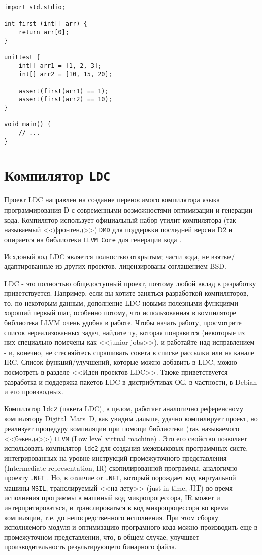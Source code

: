 \documentclass{studrep}
\begin{document}
\begin{verbatim}
import std.stdio;

int first (int[] arr) {
    return arr[0];
}

unittest {
    int[] arr1 = [1, 2, 3];
    int[] arr2 = [10, 15, 20];

    assert(first(arr1) == 1);
    assert(first(arr2) == 10);
}

void main() {
    // ...
}
\end{verbatim}

\section{Компилятор \texttt{LDC}}

Проект LDC направлен на создание переносимого компилятора языка программирования D с современными возможностями оптимизации и генерации кода. Компилятор использует официальный набор утилит компилятора (так называемый <<фронтенд>>) \texttt{DMD} для поддержки последней версии D2 и опирается на библиотеки \texttt{LLVM Core} для генерации кода \cite{ldcwiki}.

Исхдоный код LDC является полностью открытым; части кода, не взятые/адаптированные из других проектов, лицензированы соглашением BSD.

LDC - это полностью общедоступный проект, поэтому любой вклад в разработку приветствуется. Например, если вы хотите заняться разработкой компиляторов, то, по некоторым данным, дополнение LDC новыми полезными функциями -- хороший первый шаг, особенно потому, что использованная в компиляторе библиотека LLVM очень удобна в работе. Чтобы начать работу, просмотрите список нереализованных задач, найдите ту, которая понравится (некоторые из них специально помечены как <<junior jobs>>), и работайте над исправлением - и, конечно, не стесняйтесь спрашивать совета в списке рассылки или на канале IRC. Список функций/улучшений, которые можно добавить в LDC, можно посмотреть в разделе <<Идеи проектов LDC>>. Также приветствуется разработка и поддержка пакетов LDC в дистрибутивах ОС, в частности, в Debian и его производных.

Компилятор \texttt{ldc2} (пакета LDC), в целом, работает аналогично референсному компилятору Digital~Mars~D, как увидим дальше, удачно компилирует проект, но реализует процедуру компиляции при помощи библиотеки (так называемого <<бэкенда>>) \texttt{LLVM} (Low level virtual machine) \cite{llvm}.  Это его свойство позволяет использовать компилятор \texttt{ldc2} для создания межязыковых программных систе, интегрированных на уровне инструкций промежуточного представления (Intermediate representation, IR) скопилированной программы, аналогично проекту \texttt{.NET} \cite{dotnet}.  Но, в отличие от \texttt{.NET}, который порождает код виртуальной машины \texttt{MSIL}, транслируемый <<на лету>> (just in time, JIT) во время исполнения программы в машиный код микропроцессора, IR может и интерпритироваться, и транслироваться в код микропроцессора во врема компиляции, т.е. до непосредственного исполнения.  При этом сборку исполняемого модуля и оптимизацию програмного кода можно производить еще в промежуточном представлении, что, в общем случае, улучшвет производительность результирующего бинарного файла.
\end{document}
